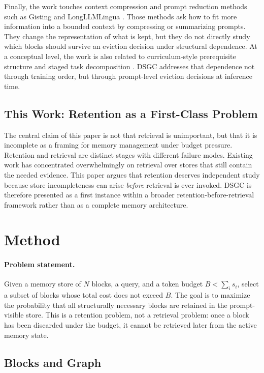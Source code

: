 \documentclass[10pt]{article}
\begin{document}
Finally, the work touches context compression and prompt reduction methods such as Gisting and LongLLMLingua \cite{gisting2023,longllmlingua2023}. Those methods ask how to fit more information into a bounded context by compressing or summarizing prompts. They change the representation of what is kept, but they do not directly study which blocks should survive an eviction decision under structural dependence. At a conceptual level, the work is also related to curriculum-style prerequisite structure and staged task decomposition \cite{curriculum2009}. DSGC addresses that dependence not through training order, but through prompt-level eviction decisions at inference time.

\subsection{This Work: Retention as a First-Class Problem}

The central claim of this paper is not that retrieval is unimportant, but that it is incomplete as a framing for memory management under budget pressure. Retention and retrieval are distinct stages with different failure modes. Existing work has concentrated overwhelmingly on retrieval over stores that still contain the needed evidence. This paper argues that retention deserves independent study because store incompleteness can arise \emph{before} retrieval is ever invoked. DSGC is therefore presented as a first instance within a broader retention-before-retrieval framework rather than as a complete memory architecture.

\section{Method}

\paragraph{Problem statement.}
Given a memory store of $N$ blocks, a query, and a token budget $B < \sum_i s_i$, select a subset of blocks whose total cost does not exceed $B$. The goal is to maximize the probability that all structurally necessary blocks are retained in the prompt-visible store. This is a retention problem, not a retrieval problem: once a block has been discarded under the budget, it cannot be retrieved later from the active memory state.

\subsection{Blocks and Graph}
\end{document}
